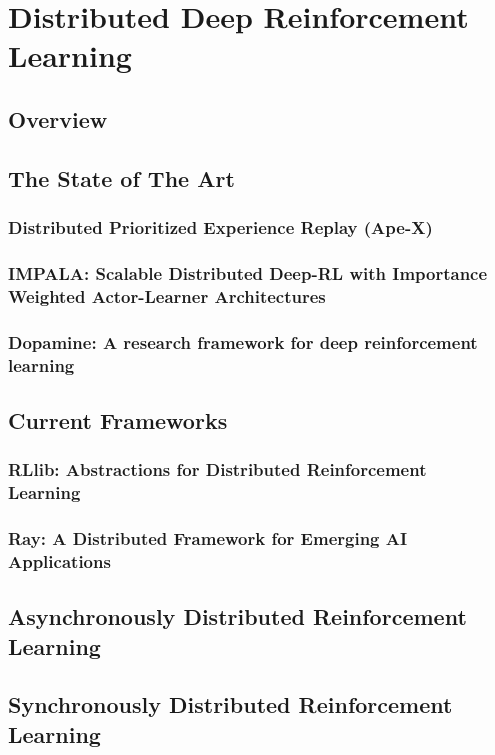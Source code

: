
\chapter{Distributed Deep Reinforcement Learning}\label{chapter:Distributed Deep Reinforcement Learning}

\section{Overview}


\section{The State of The Art}

\subsection{Distributed Prioritized Experience Replay \textbf{(Ape-X)}~\parencite{horgan2018distributed}}
\subsection{IMPALA: Scalable Distributed Deep-RL with Importance Weighted Actor-Learner Architectures~\parencite{espeholt2018impala}}
\subsection{Dopamine: A research framework for deep reinforcement learning~\parencite{castro2018dopamine}}

\section{Current Frameworks}

\subsection{RLlib: Abstractions for Distributed Reinforcement Learning~\parencite{liang2017rllib}}
\subsection{Ray: A Distributed Framework for Emerging AI Applications~\parencite{moritz2018ray}}

\section{Asynchronously Distributed Reinforcement Learning}

\section{Synchronously Distributed Reinforcement Learning}